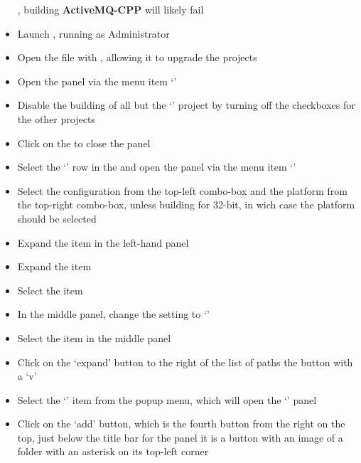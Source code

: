 \begin{itemize}
, building \textbf{ActiveMQ-CPP} will likely fail
\item\exSp{}Launch , running as Administrator
\item\exSp{}Open the file
 with , allowing it to upgrade the
projects
\item\exSp{}Open the  panel via the menu item
`'
\item\exSp{}Disable the building of all but the `' project by turning
off the  checkboxes for the other projects
\item\exSp{}Click on the  to close the  panel
\item\exSp{}Select the `' row in the  and
open the  panel via the menu item
`'
\item\exSp{}Select the  configuration from the top-left
combo-box and the  platform from the top-right combo-box, unless building for
32-bit, in wich case the  platform should be selected
\item\exSp{}Expand the  item in the left-hand panel
\item\exSp{}Expand the  item
\item\exSp{}Select the  item
\item\exSp{}In the middle panel, change the  setting to
`'
\item\exSp{}Select the  item in the middle panel
\item\exSp{}Click on the `expand' button to the right of the list of paths \longDash{} the
button with a `v'
\item\exSp{}Select the `' item from the popup menu, which
will open the `' panel
\item\exSp{}Click on the `add' button, which is the fourth button from the right on the
top, just below the title bar for the panel \longDash{} it is a button with an image of a
folder with an asterisk on its top-left corner

\end{itemize}
